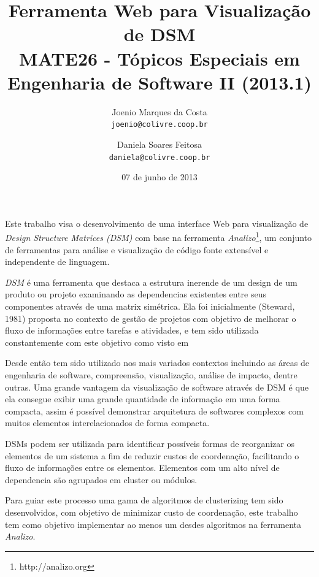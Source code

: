 \documentclass{article}
\title{Ferramenta Web para Visualização de DSM\\
 \large MATE26 - Tópicos Especiais em Engenharia de Software II (2013.1)}
\author{
  Joenio Marques da Costa\\
  \texttt{joenio@colivre.coop.br}
  \and
  Daniela Soares Feitosa\\
  \texttt{daniela@colivre.coop.br}
}
\date{07 de junho de 2013}
\begin{document}
\maketitle

Este trabalho visa o desenvolvimento de uma interface Web para visualização de
{\it Design Structure Matrices (DSM)} com base na ferramenta {\it
Analizo}\footnote{http://analizo.org}, um conjunto de ferramentas para análise
e visualização de código fonte extensível e independente de linguagem.

{\it DSM} é uma ferramenta que destaca a estrutura inerende de um design de um
produto ou projeto examinando as dependencias existentes entre seus
componentes através de uma matrix simétrica\cite{ExploringStructure}. Ela foi
inicialmente  (Steward, 1981) proposta no contexto de gestão de projetos com
objetivo de melhorar o fluxo de informações entre tarefas e atividades, e tem
sido utilizada constantemente com este objetivo como visto em
\cite{AModelBasedMethod}

Desde então tem sido utilizado nos mais variados contextos
\cite{PredictingChange, PredictingRequirementChange, UsingTheDesignStructure}
incluindo as áreas de engenharia de software, compreensão, visualização,
análise de impacto, dentre outras.  Uma grande vantagem da visualização de
software através de DSM é que ela consegue exibir uma grande quantidade de
informação em uma forma compacta, assim é possível demonstrar arquitetura de
softwares complexos com muitos elementos interelacionados de forma
compacta\cite{DependencyModel}.

DSMs podem ser utilizada para identificar possíveis formas de reorganizar os
elementos de um sistema a fim de reduzir custos de coordenação, facilitando o
fluxo de informações entre os elementos. Elementos com um alto nível de
dependencia são agrupados em cluster ou módulos.

Para guiar este processo uma gama de algoritmos de clusterizing tem sido
desenvolvidos, com objetivo de minimizar custo de coordenação, este trabalho
tem como objetivo implementar ao menos um desdes algoritmos na ferramenta {\it
Analizo}.
\end{document}
